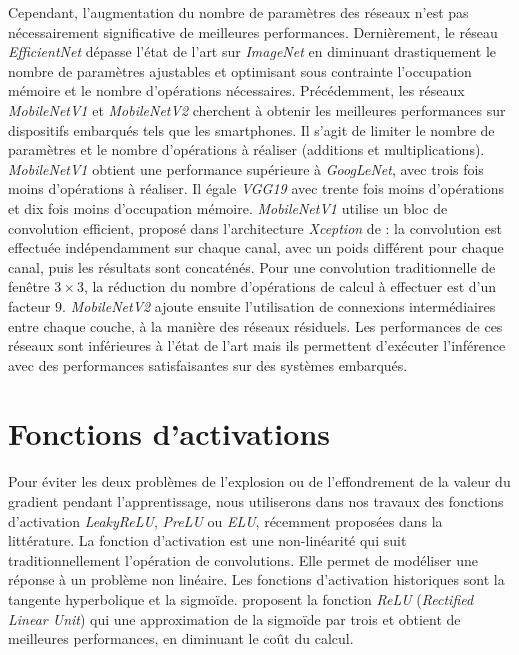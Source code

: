 Cependant, l'augmentation du nombre de paramètres des réseaux n'est pas nécessairement significative de meilleures performances.
Dernièrement, le réseau \textit{EfficientNet} dépasse l'état de l'art sur \textit{ImageNet} en diminuant drastiquement le nombre de paramètres ajustables et optimisant sous contrainte l'occupation mémoire et le nombre d'opérations nécessaires.
Précédemment, les réseaux \textit{MobileNetV1} \cite{howard_mobilenets_2017} et \textit{MobileNetV2} \cite{sandler_mobilenetv2_2018} cherchent à obtenir les meilleures performances sur dispositifs embarqués tels que les smartphones.
Il s'agit de limiter le nombre de paramètres et le nombre d'opérations à réaliser (additions et multiplications).
\textit{MobileNetV1} obtient une performance supérieure à \textit{GoogLeNet}, avec trois fois moins d'opérations à réaliser.
Il égale \textit{VGG19} avec trente fois moins d'opérations et dix fois moins d'occupation mémoire.
\textit{MobileNetV1} utilise un bloc de convolution efficient, proposé dans l'architecture \textit{Xception} de \citeauthor{chollet_xception_2016} \cite{chollet_xception_2016} : la convolution est effectuée indépendamment sur chaque canal, avec un poids différent pour chaque canal, puis les résultats sont concaténés.
Pour une convolution traditionnelle de fenêtre $3 \times 3$, la réduction du nombre d'opérations de calcul à effectuer est d'un facteur $9$.
\textit{MobileNetV2} ajoute ensuite l'utilisation de connexions intermédiaires entre chaque couche, à la manière des réseaux résiduels.
Les performances de ces réseaux sont inférieures à l'état de l'art mais ils permettent d'exécuter l'inférence avec des performances satisfaisantes sur des systèmes embarqués.

\section{Fonctions d'activations} \label{subsubsec:activation}
Pour éviter les deux problèmes de l'explosion ou de l'effondrement de la valeur du gradient pendant l'apprentissage, nous utiliserons dans nos travaux des fonctions d'activation \textit{LeakyReLU}, \textit{PreLU} ou \textit{ELU}, récemment proposées dans la littérature.
La fonction d'activation est une non-linéarité qui suit traditionnellement l'opération de convolutions.
Elle permet de modéliser une réponse à un problème non linéaire.
Les fonctions d'activation historiques sont la tangente hyperbolique et la sigmoïde.
\citeauthor{nair_rectified_2010} \cite{nair_rectified_2010} proposent la fonction \textit{ReLU} (\textit{Rectified Linear Unit}) qui une approximation de la sigmoïde par trois et obtient de meilleures performances, en diminuant le coût du calcul.

